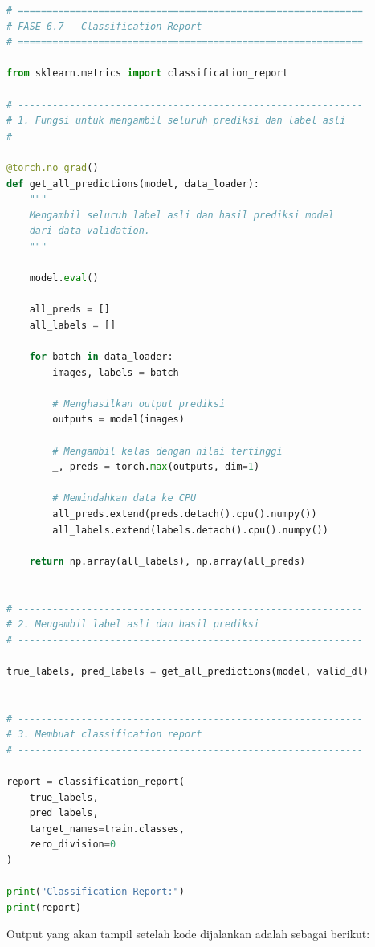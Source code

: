 \begin{lstlisting}[language=Python, caption=Classification report]
# ============================================================
# FASE 6.7 - Classification Report
# ============================================================

from sklearn.metrics import classification_report

# ------------------------------------------------------------
# 1. Fungsi untuk mengambil seluruh prediksi dan label asli
# ------------------------------------------------------------

@torch.no_grad()
def get_all_predictions(model, data_loader):
    """
    Mengambil seluruh label asli dan hasil prediksi model
    dari data validation.
    """

    model.eval()

    all_preds = []
    all_labels = []

    for batch in data_loader:
        images, labels = batch

        # Menghasilkan output prediksi
        outputs = model(images)

        # Mengambil kelas dengan nilai tertinggi
        _, preds = torch.max(outputs, dim=1)

        # Memindahkan data ke CPU
        all_preds.extend(preds.detach().cpu().numpy())
        all_labels.extend(labels.detach().cpu().numpy())

    return np.array(all_labels), np.array(all_preds)


# ------------------------------------------------------------
# 2. Mengambil label asli dan hasil prediksi
# ------------------------------------------------------------

true_labels, pred_labels = get_all_predictions(model, valid_dl)


# ------------------------------------------------------------
# 3. Membuat classification report
# ------------------------------------------------------------

report = classification_report(
    true_labels,
    pred_labels,
    target_names=train.classes,
    zero_division=0
)

print("Classification Report:")
print(report)
\end{lstlisting}

Output yang akan tampil setelah kode dijalankan adalah sebagai berikut:

